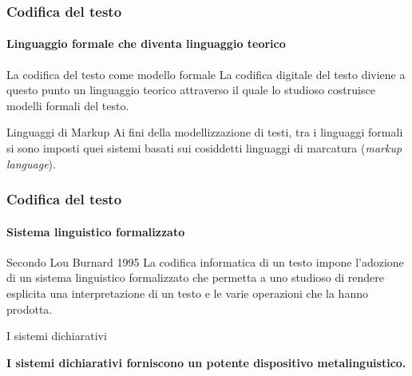 \begin{frame}
	\frametitle{Codifica del testo}
	\framesubtitle{Linguaggio formale che diventa linguaggio teorico}
	\addtocounter{nframe}{1}

	\begin{block}{La codifica del testo come modello formale}
		La codifica digitale del testo diviene a questo punto un linguaggio teorico attraverso il quale lo studioso costruisce modelli formali del testo.
	\end{block}

	\begin{block}{Linguaggi di Markup}
		Ai fini della modellizzazione di testi, tra i linguaggi formali si sono imposti quei sistemi basati sui cosiddetti linguaggi di marcatura (\textit{markup language}).
	\end{block}
\end{frame}


\begin{frame}
	\frametitle{Codifica del testo}
	\framesubtitle{Sistema linguistico formalizzato}
	\addtocounter{nframe}{1}

	\begin{block}{Secondo Lou Burnard 1995}
		La codifica informatica di un testo impone l'adozione di un sistema linguistico formalizzato che permetta a uno studioso di rendere esplicita una interpretazione di un testo e le varie operazioni che la hanno prodotta.
	\end{block}

	\begin{block}{I sistemi dichiarativi}
		\begin{center}
			\textbf{I sistemi dichiarativi forniscono un potente dispositivo metalinguistico.}
		\end{center}
	\end{block}

\end{frame}





